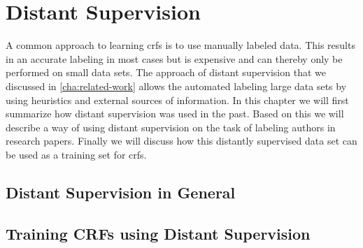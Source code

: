 \chapter{Distant Supervision}\label{cha:distant-supervision}

A common approach to learning \glspl{crf} is to use manually labeled data.
This results in an accurate labeling in most cases but is expensive and can thereby only be performed on small data sets.
The approach of \gls{distant supervision} that we discussed in \cref{cha:related-work} allows the automated labeling large data sets by using heuristics and external sources of information.
In this chapter we will first summarize how \gls{distant supervision} was used in the past. Based on this we will describe a way of using \gls{distant supervision} on the task of labeling authors in research papers. Finally we will discuss how this distantly supervised data set can be used as a training set for \glspl{crf}.\\

%

\section{Distant Supervision in General}

\section{Training CRFs using Distant Supervision}
